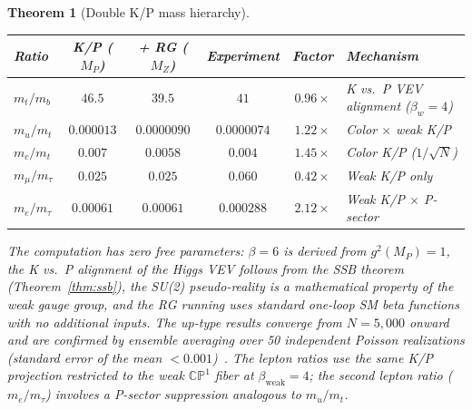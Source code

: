 \documentclass[12pt,a4paper]{article}
\newtheorem{theorem}{Theorem}
\begin{document}
\begin{theorem}[Double K/P mass hierarchy]
\begin{center}
\begin{tabular}{lccccl}
\toprule
Ratio & K/P ($M_P$) & + RG ($M_Z$) & Experiment & Factor & Mechanism \\
\midrule
$m_t/m_b$ & $46.5$ & $\mathbf{39.5}$ & $41$ & $\mathbf{0.96\times}$ & K vs.\ P VEV alignment ($\beta_w = 4$) \\
$m_u/m_t$ & $0.000013$ & $\mathbf{0.0000090}$ & $0.0000074$ & $\mathbf{1.22\times}$ & Color $\times$ weak K/P \\
$m_c/m_t$ & $0.007$ & $\mathbf{0.0058}$ & $0.004$ & $\mathbf{1.45\times}$ & Color K/P ($1/\sqrt{N}$) \\
$m_\mu/m_\tau$ & $0.025$ & $0.025$ & $0.060$ & $0.42\times$ & Weak K/P only \\
$m_e/m_\tau$ & $0.00061$ & $0.00061$ & $0.000288$ & $2.12\times$ & Weak K/P $\times$ P-sector \\
\bottomrule
\end{tabular}
\end{center}


The computation has zero free parameters: $\beta = 6$ is derived from $g^2(M_P) = 1$, the K vs.\ P alignment of the Higgs VEV follows from the SSB theorem (Theorem~\ref{thm:ssb}), the SU(2) pseudo-reality is a mathematical property of the weak gauge group, and the RG running uses standard one-loop SM beta functions with no additional inputs.  The up-type results converge from $N = 5{,}000$ onward and are confirmed by ensemble averaging over 50 independent Poisson realizations (standard error of the mean $< 0.001$)~\cite{difiore_causal}.  The lepton ratios use the same K/P projection restricted to the weak $\mathbb{CP}^1$ fiber at $\beta_{\mathrm{weak}} = 4$; the second lepton ratio ($m_e/m_\tau$) involves a P-sector suppression analogous to $m_u/m_t$.


\end{theorem}
\end{document}
